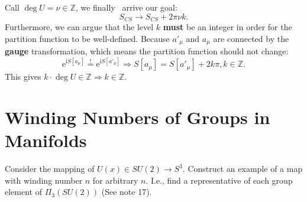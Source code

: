 \documentclass{book}
\begin{document}
Call $\deg U=\nu \in \mathbb{Z}$, we finally \ arrive our goal:
\begin{equation*}
S_{CS}\rightarrow S_{CS} +2\pi \nu k.
\end{equation*}
Furthermore, we can argue that the level $k$ \textbf{must} be an integer in order for the partition function to be well-defined. Because $a'_{\mu }$ and $a_{\mu }$ are connected by the \textbf{gauge} transformation, which means the partition function should not change:
\begin{equation*}
\mathrm{e}^{\mathrm{i} S[ a_{\mu }]}\stackrel{!}{=}\mathrm{e}^{\mathrm{i} S[ a'_{\mu }]} \Rightarrow S[ a_{\mu }] =S[ a'_{\mu }] +2k\pi ,k\in \mathbb{Z}.
\end{equation*}
This gives $k\cdot \deg U\in \mathbb{Z} \Rightarrow k\in \mathbb{Z}$. 

\section{Winding Numbers of Groups in Manifolds}
Consider the mapping of $U(x)\in SU(2)\rightarrow S^{3}$. Construct an example of a map with winding number $n$ for arbitrary $n$. I.e., find a representative of each group element of $\Pi _{3} (SU(2))$ (See note 17).
\end{document}
